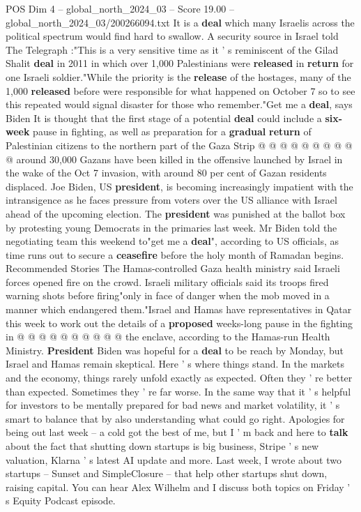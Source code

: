 \begin{textsample}{POS Dim 4 – global\_north\_2024\_03 – Score 19.00 – global\_north\_2024\_03/200266094.txt}
It is a \textbf{deal} which many Israelis across the political spectrum would find hard to swallow.
A security source in Israel told The Telegraph :"This is a very sensitive time as it ' s reminiscent of the Gilad Shalit \textbf{deal} in 2011 in which over 1,000 Palestinians were \textbf{released} in \textbf{return} for one Israeli soldier."While the priority is the \textbf{release} of the hostages, many of the 1,000 \textbf{released} before were responsible for what happened on October 7 so to see this repeated would signal disaster for those who remember."Get me a \textbf{deal}, says Biden It is thought that the first stage of a potential \textbf{deal} could include a \textbf{six-week} pause in fighting, as well as preparation for a \textbf{gradual} \textbf{return} of Palestinian citizens to the northern part of the Gaza Strip @ @ @ @ @ @ @ @ @ @ around 30,000 Gazans have been killed in the offensive launched by Israel in the wake of the Oct 7 invasion, with around 80 per cent of Gazan residents displaced.
Joe Biden, US \textbf{president}, is becoming increasingly impatient with the intransigence as he faces pressure from voters over the US alliance with Israel ahead of the upcoming election.
The \textbf{president} was punished at the ballot box by protesting young Democrats in the primaries last week.
Mr Biden told the negotiating team this weekend to"get me a \textbf{deal}", according to US officials, as time runs out to secure a \textbf{ceasefire} before the holy month of Ramadan begins.
Recommended Stories The Hamas-controlled Gaza health ministry said Israeli forces opened fire on the crowd.
Israeli military officials said its troops fired warning shots before firing"only in face of danger when the mob moved in a manner which endangered them."Israel and Hamas have representatives in Qatar this week to work out the details of a \textbf{proposed} weeks-long pause in the fighting in @ @ @ @ @ @ @ @ @ @ the enclave, according to the Hamas-run Health Ministry. \textbf{President} Biden was hopeful for a \textbf{deal} to be reach by Monday, but Israel and Hamas remain skeptical.
Here ' s where things stand.
In the markets and the economy, things rarely unfold exactly as expected.
Often they ' re better than expected.
Sometimes they ' re far worse.
In the same way that it ' s helpful for investors to be mentally prepared for bad news and market volatility, it ' s smart to balance that by also understanding what could go right.
Apologies for being out last week -- a cold got the best of me, but I ' m back and here to \textbf{talk} about the fact that shutting down startups is big business, Stripe ' s new valuation, Klarna ' s latest AI update and more.
Last week, I wrote about two startups -- Sunset and SimpleClosure -- that help other startups shut down, raising capital.
You can hear Alex Wilhelm and I discuss both topics on Friday ' s Equity Podcast episode.

\end{textsample}
